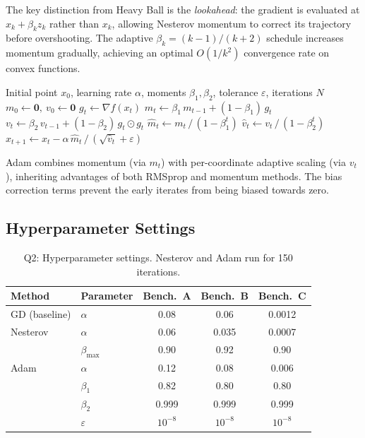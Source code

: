 \documentclass[11pt,a4paper]{article}
\begin{document}
The key distinction from Heavy Ball is the \emph{lookahead}: the gradient is evaluated at $x_k + \beta_k z_k$ rather than $x_k$, allowing Nesterov momentum to correct its trajectory before overshooting. The adaptive $\beta_k = (k-1)/(k+2)$ schedule increases momentum gradually, achieving an optimal $O(1/k^2)$ convergence rate on convex functions.

\begin{algorithm}[H]
\caption{Adam Optimiser}
\label{alg:adam}
\begin{algorithmic}[1]
\Require Initial point $x_0$, learning rate $\alpha$, moments $\beta_1, \beta_2$, tolerance $\varepsilon$, iterations $N$
\State $m_0 \gets \mathbf{0},\ v_0 \gets \mathbf{0}$
    \State $g_t \gets \nabla f(x_t)$
    \State $m_t \gets \beta_1\, m_{t-1} + (1 - \beta_1)\, g_t$ 
    \State $v_t \gets \beta_2\, v_{t-1} + (1 - \beta_2)\, g_t \odot g_t$ 
    \State $\hat{m}_t \gets m_t\, /\, (1 - \beta_1^t)$ 
    \State $\hat{v}_t \gets v_t\, /\, (1 - \beta_2^t)$
    \State $x_{t+1} \gets x_t - \alpha\, \hat{m}_t\, /\, (\sqrt{\hat{v}_t} + \varepsilon)$
\EndFor
\end{algorithmic}
\end{algorithm}

Adam combines momentum (via $m_t$) with per-coordinate adaptive scaling (via $v_t$), inheriting advantages of both RMSprop and momentum methods. The bias correction terms prevent the early iterates from being biased towards zero.

\subsection{Hyperparameter Settings}

\begin{table}[H]
\centering
\caption{Q2: Hyperparameter settings. Nesterov and Adam run for 150 iterations.}
\label{tab:q2_params}
\begin{tabular}{llccc}
\toprule
\textbf{Method} & \textbf{Parameter} & \textbf{Bench.\ A} & \textbf{Bench.\ B} & \textbf{Bench.\ C} \\
\midrule
GD (baseline) & $\alpha$ & 0.08 & 0.06 & 0.0012 \\
\midrule
Nesterov & $\alpha$ & 0.06 & 0.035 & 0.0007 \\
 & $\beta_{\max}$ & 0.90 & 0.92 & 0.90 \\
\midrule
Adam & $\alpha$ & 0.12 & 0.08 & 0.006 \\
 & $\beta_1$ & 0.82 & 0.80 & 0.80 \\
 & $\beta_2$ & 0.999 & 0.999 & 0.999 \\
 & $\varepsilon$ & $10^{-8}$ & $10^{-8}$ & $10^{-8}$ \\
\bottomrule
\end{tabular}
\end{table}
\end{document}
